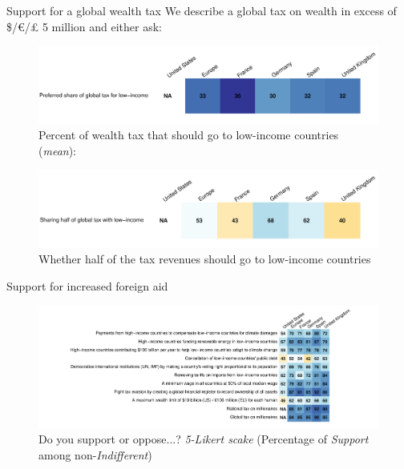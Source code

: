 \begin{framefont}{\small}
\begin{frame}{Support for a global wealth tax\label{}}
\bbvs \ip We describe a global tax on wealth in excess of \$/\euro{}/£ 5 million and either ask:
\ee
\vspace{-.1cm}
\begin{figure}
    \centering 
    \caption{Percent of wealth tax that should go to low-income countries (\textit{mean}):}%
    \includegraphics[height=.3\textheight]{../figures/country_comparison/global_tax_global_share_mean.pdf} 
\end{figure}
    \begin{figure}
        \centering 
        \caption{Whether half of the tax revenues should go to low-income countries}
        \includegraphics[height=.3\textheight]{../figures/country_comparison/global_tax_sharing_positive.pdf} 
    \end{figure}
\end{frame}

\begin{frame}{Support for increased foreign aid\label{}}
    \begin{figure} %
        \centering 
        \caption{Do you support or oppose...? \textit{5-Likert scake} (Percentage of \textit{Support} among non-\textit{Indifferent})}
        \includegraphics[height=.9\textheight]{../figures/country_comparison/support_likert_share.pdf} 
    \end{figure}
\end{frame}


\end{framefont}
